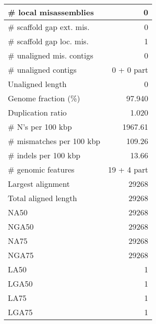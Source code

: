 \documentclass[12pt,a4paper]{article}
\begin{document}
\begin{table}[ht]
\begin{center}
\begin{tabular}{|l*{1}{|r}|}
\# local misassemblies & 0 \\ \hline
\# scaffold gap ext. mis. & 0 \\ \hline
\# scaffold gap loc. mis. & 1 \\ \hline
\# unaligned mis. contigs & 0 \\ \hline
\# unaligned contigs & 0 + 0 part \\ \hline
Unaligned length & 0 \\ \hline
Genome fraction (\%) & 97.940 \\ \hline
Duplication ratio & 1.020 \\ \hline
\# N's per 100 kbp & 1967.61 \\ \hline
\# mismatches per 100 kbp & 109.26 \\ \hline
\# indels per 100 kbp & 13.66 \\ \hline
\# genomic features & 19 + 4 part \\ \hline
Largest alignment & 29268 \\ \hline
Total aligned length & 29268 \\ \hline
NA50 & 29268 \\ \hline
NGA50 & 29268 \\ \hline
NA75 & 29268 \\ \hline
NGA75 & 29268 \\ \hline
LA50 & 1 \\ \hline
LGA50 & 1 \\ \hline
LA75 & 1 \\ \hline
LGA75 & 1 \\ \hline
\end{tabular}
\end{center}
\end{table}
\end{document}
